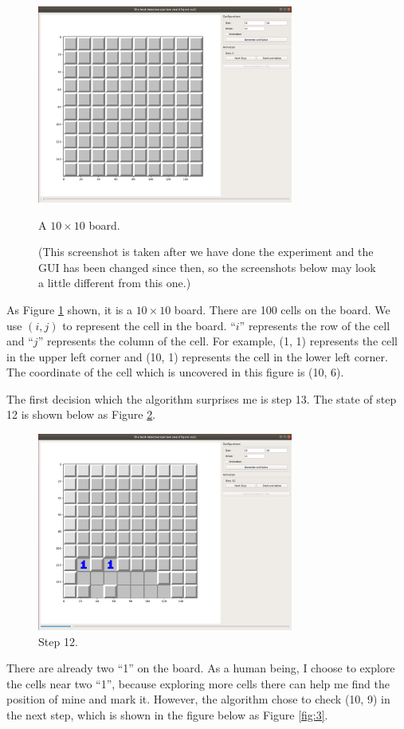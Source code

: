 \documentclass[letter]{article}
\begin{document}
\begin{enumerate}
	\begin{figure}[H]
		\centering
		\includegraphics[width=0.75\textwidth]{../pics/1.png}
		\caption{\label{fig:1} A $ 10 \times 10 $ board. }
		\caption*{(This screenshot is taken after we have done the experiment and the GUI has been changed since then, so the screenshots below may look a little different from this one.)}
	\end{figure}
	As Figure \ref{fig:1} shown, it is a $ 10 \times 10 $ board. There are 100 cells on the board. We use $ (i, j) $ to represent the cell in the board. ``$ i $'' represents the row of the cell and ``$ j $'' represents the column of the cell. For example, (1, 1) represents the cell in the upper left corner and (10, 1) represents the cell in the lower left corner. The coordinate of the cell which is uncovered in this figure is (10, 6).
	
	The first decision which the algorithm surprises me is step 13. The state of step 12 is shown below as Figure \ref{fig:2}.
	
	\begin{figure}[H]
		\centering
		\includegraphics[width=0.75\textwidth]{../pics/2.png}
		\caption{\label{fig:2} Step 12.}
	\end{figure}
	There are already two ``1'' on the board. As a human being, I choose to explore the cells near two ``1'', because exploring more cells there can help me find the position of mine and mark it. However, the algorithm chose to check (10, 9) in the next step, which is shown in the figure below as Figure \ref{fig:3}.
	

\end{enumerate}
\end{document}
